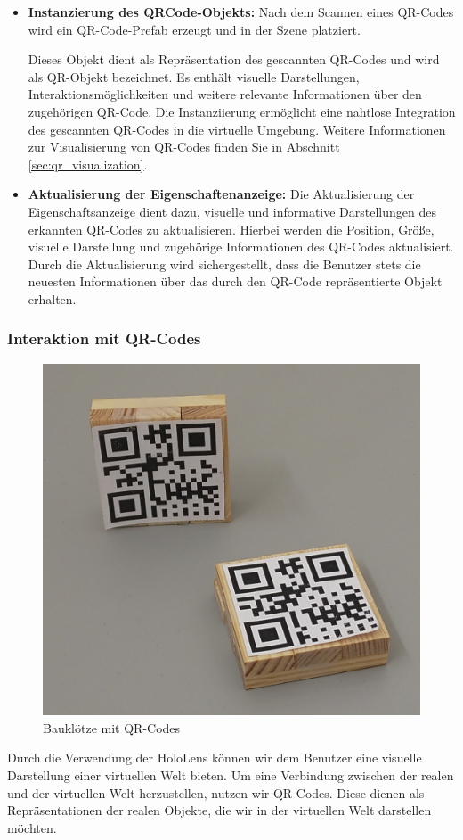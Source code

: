 \begin{itemize}
\item \textbf{Instanzierung des QRCode-Objekts:}
Nach dem Scannen eines QR-Codes wird ein QR-Code-Prefab erzeugt und in der Szene platziert.

Dieses Objekt dient als Repräsentation des gescannten QR-Codes und wird als QR-Objekt bezeichnet. Es enthält visuelle
Darstellungen, Interaktionsmöglichkeiten und weitere relevante Informationen über den zugehörigen QR-Code. Die Instanziierung
ermöglicht eine nahtlose Integration des gescannten QR-Codes in die virtuelle Umgebung. Weitere Informationen zur Visualisierung
von QR-Codes finden Sie in Abschnitt \ref{sec:qr_visualization}.

\item \textbf{Aktualisierung der Eigenschaftenanzeige:}
Die Aktualisierung der Eigenschaftsanzeige dient dazu, visuelle und informative Darstellungen des erkannten QR-Codes zu
aktualisieren. Hierbei werden die Position, Größe, visuelle Darstellung und zugehörige Informationen des QR-Codes aktualisiert.
Durch die Aktualisierung wird sichergestellt, dass die Benutzer stets die neuesten Informationen über das durch den QR-Code
repräsentierte Objekt erhalten.

\end{itemize}

\subsubsection{Interaktion mit QR-Codes}
\begin{figure}[H]
\centering
\includegraphics[scale=0.5, angle=0]{images/bauklotz}
\caption{Bauklötze mit QR-Codes}
\label{fig:bauklotz}
\end{figure}
Durch die Verwendung der HoloLens können wir dem Benutzer eine visuelle Darstellung einer virtuellen Welt bieten. Um eine
Verbindung zwischen der realen und der virtuellen Welt herzustellen, nutzen wir QR-Codes.  Diese dienen als Repräsentationen
der realen Objekte, die wir in der virtuellen Welt darstellen möchten.

